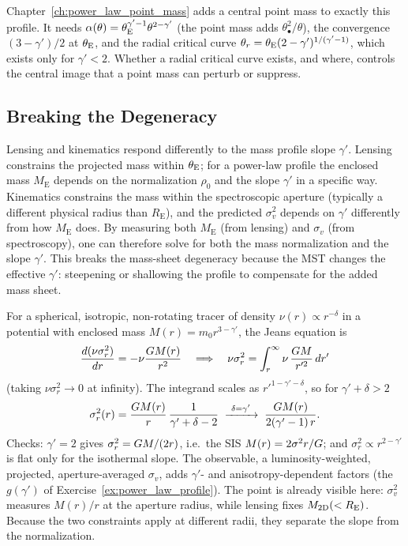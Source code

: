 \begin{bridge}
Chapter~\ref{ch:power_law_point_mass} adds a central point mass to exactly
this profile.  It needs $\alpha(\theta) = \theta_{\mathrm{E}}^{\gamma'-1}\theta^{2-\gamma'}$
(the point mass adds $\theta_\bullet^2/\theta$), the convergence
$(3-\gamma')/2$ at $\theta_{\mathrm{E}}$, and the radial critical curve
$\theta_r = \theta_{\mathrm{E}}(2-\gamma')^{1/(\gamma'-1)}$, which exists only for
$\gamma' < 2$.  Whether a radial critical curve exists, and where, controls
the central image that a point mass can perturb or suppress.
\end{bridge}


\subsection{Breaking the Degeneracy}

Lensing and kinematics respond differently to the mass profile
slope $\gamma'$.  Lensing constrains the projected mass within
$\theta_{\mathrm{E}}$; for a power-law profile the enclosed mass
$M_{\mathrm{E}}$ depends on the normalization $\rho_0$ and the slope
$\gamma'$ in a specific way.  Kinematics constrains the mass within
the spectroscopic aperture (typically a different physical radius
than $R_{\mathrm{E}}$), and the predicted $\sigma_v^2$ depends on
$\gamma'$ differently from how $M_{\mathrm{E}}$ does.  By measuring
both $M_{\mathrm{E}}$ (from lensing) and $\sigma_v$ (from
spectroscopy), one can therefore solve for both the mass
normalization and the slope $\gamma'$.  This breaks the mass-sheet
degeneracy because the MST changes the effective $\gamma'$:
steepening or shallowing the profile to compensate for the added
mass sheet.

\begin{derivation}
For a spherical, isotropic, non-rotating tracer of density
$\nu(r) \propto r^{-\delta}$ in a potential with enclosed mass
$M(r) = m_0 r^{3-\gamma'}$, the Jeans equation is
\[
  \frac{d(\nu\sigma_r^2)}{dr} = -\nu\frac{G M(r)}{r^2}
  \quad\Longrightarrow\quad
  \nu\sigma_r^2 = \int_r^\infty \nu\,\frac{G M}{r'^2}\,dr'
\]
(taking $\nu\sigma_r^2 \to 0$ at infinity).  The integrand scales as
$r'^{1-\gamma'-\delta}$, so for $\gamma' + \delta > 2$
\[
  \sigma_r^2(r) = \frac{G M(r)}{r}\,\frac{1}{\gamma' + \delta - 2}
  \;\xrightarrow{\ \delta = \gamma'\ }\;
  \frac{G M(r)}{2(\gamma'-1)\,r} .
\]
Checks: $\gamma' = 2$ gives $\sigma_r^2 = G M/(2r)$, i.e.\ the SIS
$M(r) = 2\sigma^2r/G$; and $\sigma_r^2 \propto r^{2-\gamma'}$ is flat
only for the isothermal slope.  The observable, a luminosity-weighted,
projected, aperture-averaged $\sigma_v$, adds $\gamma'$- and
anisotropy-dependent factors (the $g(\gamma')$ of
Exercise~\ref{ex:power_law_profile}).  The point is already visible
here: $\sigma_v^2$ measures $M(r)/r$ at the aperture radius, while lensing
fixes $M_{\mathrm{2D}}(<R_{\mathrm{E}})$.  Because the two constraints apply at
different radii, they separate the slope from the normalization.
\end{derivation}


